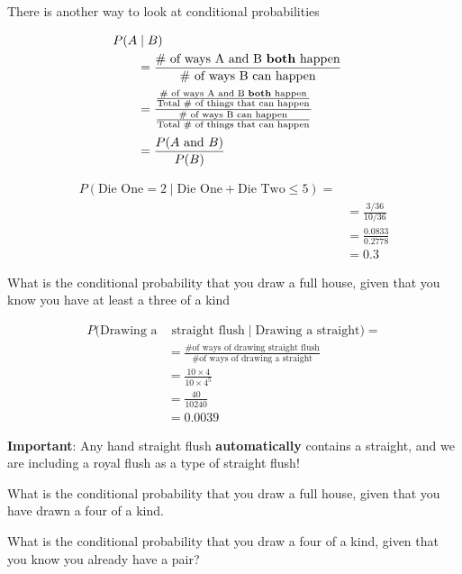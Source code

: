 %
\begin{frame}

There is another way to look at conditional probabilities

\begin{align*}
P(A & \mid B) & \\
%
&= \frac{\text{\# of ways A and B \textbf{both} happen}}{\text{\#
of ways B can happen}} \\[0.5ex]
%
&= \frac{\frac{\text{\# of ways A and B \textbf{both} happen}}{\text{Total \# of
things that can happen}}}{\frac{\text{\# of ways B can happen}}{\text{Total \# of
things that can happen}}} \\[0.5ex]
%
&= \frac{P(A \text{ and } B)}{P(B)}
\end{align*}

\end{frame}

\begin{frame}

\begin{align*}
P(\text{Die One} = 2 \mid \text{Die One} + \text{Die Two} \leq 5) = \\
&= \frac{3/36}{10/36} \\
&= \frac{0.0833}{0.2778} \\
&= 0.3
\end{align*}

\end{frame}


%
\begin{frame}

What is the conditional probability that you draw a full house, given that you know you
have at least a three of a kind

\begin{align*}
P(\text{Drawing a} & \text{ straight flush} \mid \text{Drawing a straight}) = \\
%
&= \frac{\text{\# of ways of drawing straight flush}}{\text{\# of ways of drawing
a straight}} \\
%
&= \frac{ 10 \times 4 } { 10 \times 4 ^ 5} \\
%
&= \frac{40}{10240} \\
%
&= 0.0039
%
\end{align*}

\textbf{Important}: Any hand straight flush \textbf{automatically}
contains a straight, and we are including a royal flush as a type of straight flush!

\end{frame}
%

%
\begin{frame}
What is the conditional probability that you draw a full house, given that you
have drawn a four of a kind.

What is the conditional probability that you draw a four of a kind, given that
you know you already have a pair?
\end{frame}
